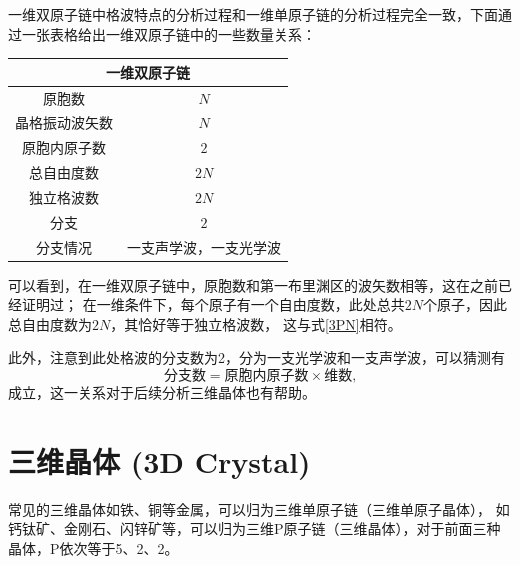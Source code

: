 \documentclass[declarePage]{ecnuthesis}
\begin{document}
一维双原子链中格波特点的分析过程和一维单原子链的分析过程完全一致，下面通过一张表格给出一维双原子链中的一些数量关系：
\begin{table}[htb]
    \centering
    \begin{tabular}{|c|c|}
        \hline
        \multicolumn{2}{|c|}{一维双原子链}     \\ 
        \hline
        原胞数         & $N$                   \\ 
        \hline
        晶格振动波矢数 & $N$                   \\ 
        \hline
        原胞内原子数   & $2$                   \\ 
        \hline
        总自由度数     & $2N$                  \\ 
        \hline
        独立格波数     & $2N$                  \\ 
        \hline
        分支           & $2$                   \\ 
        \hline
        分支情况       & 一支声学波，一支光学波\\ 
        \hline
    \end{tabular}
\end{table}

可以看到，在一维双原子链中，原胞数和第一布里渊区的波矢数相等，这在之前已经证明过；%
在一维条件下，每个原子有一个自由度数，此处总共$2N$个原子，因此总自由度数为$2N$，其恰好等于独立格波数，%
这与式\ref{3PN}相符。

此外，注意到此处格波的分支数为2，分为一支光学波和一支声学波，可以猜测有
\begin{equation}
    \text{分支数} = \text{原胞内原子数} \times \text{维数,} \label{Bran}
\end{equation}
成立，这一关系对于后续分析三维晶体也有帮助。

\newpage

\section{三维晶体 (3D Crystal)}

常见的三维晶体如铁、铜等金属，可以归为三维单原子链（三维单原子晶体），%
如钙钛矿、金刚石、闪锌矿等，可以归为三维P原子链（三维晶体），对于前面三种晶体，P依次等于5、2、2。
\end{document}
